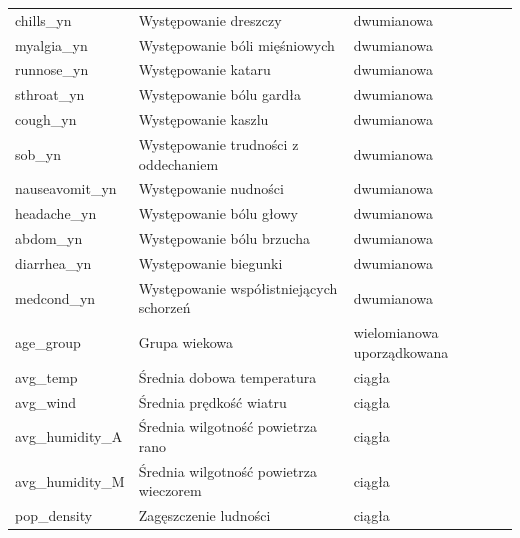 \documentclass[polish, twoside, 12pt, a4paper]{article}
\theoremstyle{definition}
\theoremstyle{plain}
\theoremstyle{remark}
\begin{document}
\begin{landscape}
{\begin{longtable}{lll}
chills\_yn                & Występowanie dreszczy                                & dwumianowa                    \\
myalgia\_yn               & Występowanie bóli mięśniowych                        & dwumianowa                    \\
runnose\_yn               & Występowanie kataru                                  & dwumianowa                    \\
sthroat\_yn               & Występowanie bólu gardła                             & dwumianowa                    \\
cough\_yn                 & Występowanie kaszlu                                  & dwumianowa                    \\
sob\_yn                   & Występowanie trudności z oddechaniem                 & dwumianowa                    \\
nauseavomit\_yn           & Występowanie nudności                                & dwumianowa                    \\
headache\_yn              & Występowanie bólu głowy                              & dwumianowa                    \\
abdom\_yn                 & Występowanie bólu brzucha                            & dwumianowa                    \\
diarrhea\_yn              & Występowanie biegunki                                & dwumianowa                    \\
medcond\_yn               & Występowanie współistniejących schorzeń              & dwumianowa                    \\
age\_group                & Grupa wiekowa                                        & wielomianowa uporządkowana    \\
avg\_temp                 & Średnia dobowa temperatura                           & ciągła                        \\
avg\_wind                 & Średnia prędkość wiatru                              & ciągła                        \\
avg\_humidity\_A          & Średnia wilgotność powietrza rano                    & ciągła                        \\
avg\_humidity\_M          & Średnia wilgotność powietrza wieczorem               & ciągła                        \\
pop\_density              & Zagęszczenie ludności                                & ciągła                  \\
 
 \hline
\end{longtable}
}
\end{landscape}
\end{document}
